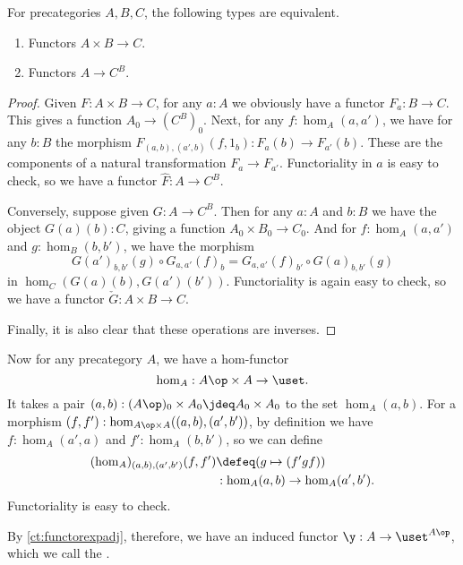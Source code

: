 \begin{lem}\label{ct:functorexpadj}
  For precategories $A,B,C$, the following types are equivalent.
  \begin{enumerate}
  \item Functors $A\times B\to C$.
  \item Functors $A\to C^B$.
  \end{enumerate}
\end{lem}
\begin{proof}
  Given $F:A\times B\to C$, for any $a:A$ we obviously have a functor $F_a : B\to C$.
  This gives a function $A_0 \to (C^B)_0$.
  Next, for any $f:\hom_A(a,a')$, we have for any $b:B$ the morphism $F_{(a,b),(a',b)}(f,1_b):F_a(b) \to F_{a'}(b)$.
  These are the components of a natural transformation $F_a \to F_{a'}$.
  Functoriality in $a$ is easy to check, so we have a functor $\hat{F}:A\to C^B$.

  Conversely, suppose given $G:A\to C^B$.
  Then for any $a:A$ and $b:B$ we have the object $G(a)(b):C$, giving a function $A_0 \times B_0 \to C_0$.
  And for $f:\hom_A(a,a')$ and $g:\hom_B(b,b')$, we have the morphism
  \begin{equation*}
     G(a')_{b,b'}(g)\circ G_{a,a'}(f)_b = G_{a,a'}(f)_{b'} \circ  G(a)_{b,b'}(g)
  \end{equation*}
  in $\hom_C(G(a)(b), G(a')(b'))$.
  Functoriality is again easy to check, so we have a functor $\check{G}:A\times B \to C$.

  Finally, it is also clear that these operations are inverses.
\end{proof}

Now for any precategory $A$, we have a hom-functor
%
\[\hom_A : A\op \times A \to \uset.\]
It takes a pair $(a,b): (A\op)_0 \times A_0 \jdeq A_0 \times A_0$ to the set $\hom_A(a,b)$.
For a morphism $(f,f') : \hom_{A\op\times A}((a,b),(a',b'))$, by definition we have $f:\hom_A(a',a)$ and $f':\hom_A(b,b')$, so we can define
\begin{align*}
  (\hom_A)_{(a,b),(a',b')}(f,f')
  &\defeq (g \mapsto (f'gf))\\
  &: \hom_A(a,b) \to \hom_A(a',b').
\end{align*}
Functoriality is easy to check.

By \cref{ct:functorexpadj}, therefore, we have an induced functor $\y:A\to \uset^{A\op}$, which we call the .
%
%

